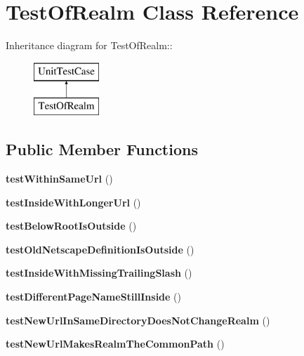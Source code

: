 \hypertarget{class_test_of_realm}{
\section{TestOfRealm Class Reference}
\label{class_test_of_realm}
}
Inheritance diagram for TestOfRealm::\begin{figure}[H]
\begin{center}
\leavevmode
\includegraphics[height=2cm]{class_test_of_realm}
\end{center}
\end{figure}
\subsection*{Public Member Functions}
\begin{DoxyCompactItemize}
\item 
\hypertarget{class_test_of_realm_a227207542edc0b0da651ae56c2a96a06}{
{\bfseries testWithinSameUrl} ()}
\label{class_test_of_realm_a227207542edc0b0da651ae56c2a96a06}

\item 
\hypertarget{class_test_of_realm_afba7237229a706a46d911be66f6c37fb}{
{\bfseries testInsideWithLongerUrl} ()}
\label{class_test_of_realm_afba7237229a706a46d911be66f6c37fb}

\item 
\hypertarget{class_test_of_realm_a7886efd834f3fe138c65c12318c2cbf3}{
{\bfseries testBelowRootIsOutside} ()}
\label{class_test_of_realm_a7886efd834f3fe138c65c12318c2cbf3}

\item 
\hypertarget{class_test_of_realm_af9fe241ae21218b5be364515a42b807e}{
{\bfseries testOldNetscapeDefinitionIsOutside} ()}
\label{class_test_of_realm_af9fe241ae21218b5be364515a42b807e}

\item 
\hypertarget{class_test_of_realm_af1df8bbb8f1303d56d7ef1d93a791afb}{
{\bfseries testInsideWithMissingTrailingSlash} ()}
\label{class_test_of_realm_af1df8bbb8f1303d56d7ef1d93a791afb}

\item 
\hypertarget{class_test_of_realm_a847dd55a618ca1ad06a14dd6b0304005}{
{\bfseries testDifferentPageNameStillInside} ()}
\label{class_test_of_realm_a847dd55a618ca1ad06a14dd6b0304005}

\item 
\hypertarget{class_test_of_realm_ae5d01c55293cb7a95dcaa660d2e1f440}{
{\bfseries testNewUrlInSameDirectoryDoesNotChangeRealm} ()}
\label{class_test_of_realm_ae5d01c55293cb7a95dcaa660d2e1f440}

\item 
\hypertarget{class_test_of_realm_a0a64d4b633b0c81f4db472fe1a97e0cc}{
{\bfseries testNewUrlMakesRealmTheCommonPath} ()}
\label{class_test_of_realm_a0a64d4b633b0c81f4db472fe1a97e0cc}

\end{DoxyCompactItemize}


